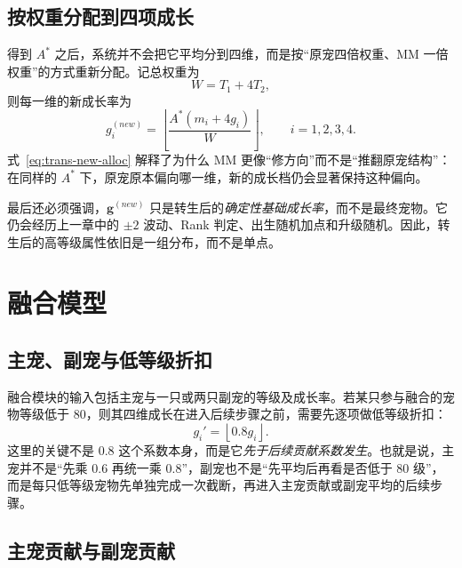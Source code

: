 \subsection{按权重分配到四项成长}

得到 $A^{*}$ 之后，系统并不会把它平均分到四维，而是按“原宠四倍权重、MM 一倍权重”的方式重新分配。记总权重为
\begin{equation}
    W = T_1 + 4T_2,
\end{equation}
则每一维的新成长率为
\begin{equation}
    g_i^{(new)} = \left\lfloor \frac{A^{*}(m_i + 4g_i)}{W} \right\rfloor, \qquad i=1,2,3,4.
    \label{eq:trans-new-alloc}
\end{equation}
式~\eqref{eq:trans-new-alloc} 解释了为什么 MM 更像“修方向”而不是“推翻原宠结构”：在同样的 $A^{*}$ 下，原宠原本偏向哪一维，新的成长档仍会显著保持这种偏向。

最后还必须强调，$\bm{g}^{(new)}$ 只是转生后的\emph{确定性基础成长率}，而不是最终宠物。它仍会经历上一章中的 $\pm2$ 波动、Rank 判定、出生随机加点和升级随机。因此，转生后的高等级属性依旧是一组分布，而不是单点。

\section{融合模型}

\subsection{主宠、副宠与低等级折扣}

融合模块的输入包括主宠与一只或两只副宠的等级及成长率。若某只参与融合的宠物等级低于 $80$，则其四维成长在进入后续步骤之前，需要先逐项做低等级折扣：
\begin{equation}
    g_i' = \left\lfloor 0.8 g_i \right\rfloor.
    \label{eq:fusion-level-discount}
\end{equation}
这里的关键不是 $0.8$ 这个系数本身，而是它\emph{先于后续贡献系数发生}。也就是说，主宠并不是“先乘 $0.6$ 再统一乘 $0.8$”，副宠也不是“先平均后再看是否低于 $80$ 级”，而是每只低等级宠物先单独完成一次截断，再进入主宠贡献或副宠平均的后续步骤。

\subsection{主宠贡献与副宠贡献}

